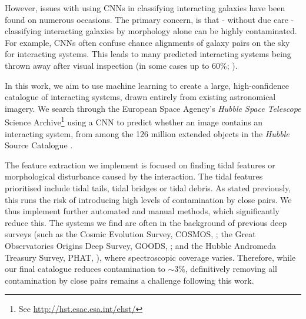 However, issues with using CNNs in classifying interacting galaxies have been found on numerous occasions. The primary concern, is that - without due care - classifying interacting galaxies by morphology alone can be highly contaminated. For example, CNNs often confuse chance alignments of galaxy pairs on the sky for interacting systems. This leads to many predicted interacting systems being thrown away after visual inspection (in some cases up to 60\%; \citet{2019MNRAS.490.5390B, 2022A&A...661A..52P}). 

In this work, we aim to use machine learning to create a large, high-confidence catalogue of interacting systems, drawn entirely from existing astronomical imagery. We search through the European Space Agency's \emph{Hubble Space Telescope} Science Archive\footnote{See \url{http://hst.esac.esa.int/ehst/}} using a CNN to predict whether an image contains an interacting system, from among the 126 million extended objects in the \emph{Hubble} Source Catalogue \citep[HSC;][]{2016AJ....151..134W}. \DIFaddbegin {}\texttt{} 

\DIFaddend The feature extraction we implement is focused on finding tidal features or morphological disturbance caused by the interaction. The tidal features prioritised include tidal tails, tidal bridges or tidal debris. As stated previously, this runs the risk of introducing high levels of contamination by close pairs. We thus implement further automated and manual methods, which significantly reduce this. The systems we find are often in the background of previous deep surveys (such as the Cosmic Evolution Survey, COSMOS, \citealt{2007ApJS..172....1S}; the Great Observatories Origins Deep Survey, GOODS, \citealt{2004ApJ...600L..93G}; and the \DIFdelbegin {}\DIFdelend \DIFaddbegin {}\DIFaddend Hubble Andromeda Treasury Survey, PHAT, \citealt{2012ApJS..200...18D}), where spectroscopic coverage varies. Therefore, while our final catalogue reduces contamination to $\sim 3\%$, definitively removing all contamination by close pairs remains a challenge following this work.

